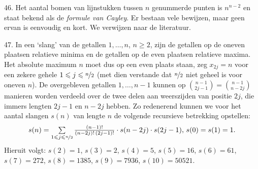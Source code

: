 \begin{problem}{46.}
	Het aantal bomen van lijnstukken tussen $n$ genummerde punten is $n^{n - 2}$ en staat bekend als de \textit{formule van Cayley}. Er bestaan vele bewijzen, maar geen ervan is eenvoudig en kort. We verwijzen naar de literatuur.
\end{problem}

\clearpage

\begin{problem}{47.}
	In een `slang' van de getallen $1,\dotsc,n$, $n \geq 2$, zijn de getallen op de oneven plaatsen relatieve minima en de getallen op de even plaatsen relatieve maxima. Het absolute maximum $n$ moet dus op een even plaats staan, zeg $x_{2j} = n$ voor een zekere gehele $1 \leq j \leq \nicefrac{n}{2}$ (met dien verstande dat $\nicefrac{n}{2}$ niet geheel is voor oneven $n$). De overgebleven getallen $1,\dotsc,n - 1$ kunnen op $\binom{n - 1}{2j - 1} = \binom{n - 1}{n - 2j}$ manieren worden verdeeld over de twee delen aan weerszijden van positie $2j$, die immers lengten $2j - 1$ en $n - 2j$ hebben. Zo redenerend kunnen we voor het aantal slangen $s(n)$ van lengte $n$ de volgende recursieve betrekking opstellen:
    \begin{equation*}
        s(n) = \textstyle\sum\limits_{1 \leq j \leq \nicefrac{n}{2}} \frac{(n - 1)!}{(n - 2j)!\, (2j - 1)!} \cdot s(n - 2j) \cdot s(2j - 1),\, s(0) = s(1) = 1.
    \end{equation*}
    Hieruit volgt: $s(2) = 1$, $s(3) = 2$, $s(4) = 5$, $s(5) = 16$, $s(6) = 61$, $s(7) = 272$, $s(8) = 1385$, $s(9) = 7936$, $s(10) = 50521$.
\end{problem}

\clearpage

